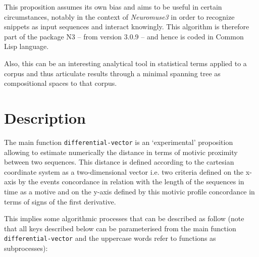 \bigskip

This proposition assumes its own bias and aims to be useful in certain circumstances, notably in the context of \textsl{Neuromuse3} in order to recognize snippets as input sequences and interact knowingly. This algorithm is therefore part of the package N3 -- from version 3.0.9 -- and hence is coded in Common Lisp language. 

\bigskip

Also, this can be an interesting analytical tool in statistical terms applied to a corpus and thus articulate results through a minimal spanning tree as compositional spaces \citep{deec} to that corpus.

\section{Description}

The main function \texttt{differential-vector} is an `experimental' proposition allowing to estimate numerically the distance in terms of motivic proximity between two sequences. This distance is defined according to the cartesian coordinate system as a two-dimensional vector i.e. two criteria defined on the x-axis by the events concordance in relation with the length of the sequences in time as a motive and on the y-axis defined by this motivic profile concordance in terms of signs of the first derivative. 

\bigskip

This implies some algorithmic processes that can be described as follow  (note that all keys described below can be parameterised from the main function \texttt{differential-vector} and the uppercase words refer to functions as subprocesses):

